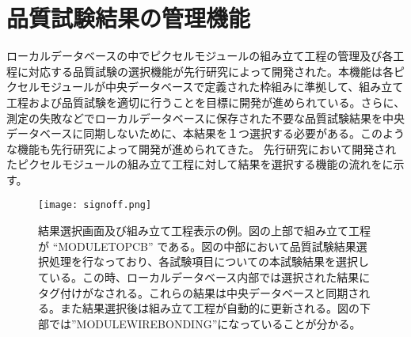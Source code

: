 \section{品質試験結果の管理機能}
\label{sec:kanri}

ローカルデータベースの中でピクセルモジュールの組み立て工程の管理及び各工程に対応する品質試験の選択機能が先行研究\cite{oku}によって開発された。本機能は各ピクセルモジュールが中央データベースで定義された枠組みに準拠して、組み立て工程および品質試験を適切に行うことを目標に開発が進められている。さらに、測定の失敗などでローカルデータベースに保存された不要な品質試験結果を中央データベースに同期しないために、本結果を１つ選択する必要がある。このような機能も先行研究によって開発が進められてきた。
先行研究において開発されたピクセルモジュールの組み立て工程に対して結果を選択する機能の流れをに示す。
\begin{figure}[tbp]
  \centering
  \texttt{[image: signoff.png]}
  \caption[結果選択画面及び組み立て工程表示の例]{結果選択画面及び組み立て工程表示の例。図の上部で組み立て工程が “MODULETOPCB” である。図の中部において品質試験結果選択処理を行なっており、各試験項目についての本試験結果を選択している。この時、ローカルデータベース内部では選択された結果にタグ付けがなされる。これらの結果は中央データベースと同期される。また結果選択後は組み立て工程が自動的に更新される。図の下部では”MODULEWIREBONDING”になっていることが分かる。}
  \label{fig:sign-off}
\end{figure}

